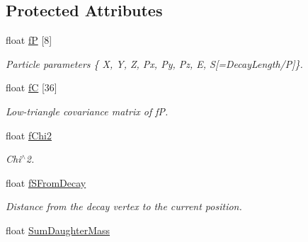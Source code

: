 \subsection*{Protected Attributes}
\begin{DoxyCompactItemize}
\item 
float \hyperlink{classKFParticleBase_a48e6bfc3b4faad54849cf2390d88f0c2}{fP} \mbox{[}8\mbox{]}\hypertarget{classKFParticleBase_a48e6bfc3b4faad54849cf2390d88f0c2}{}\label{classKFParticleBase_a48e6bfc3b4faad54849cf2390d88f0c2}

\begin{DoxyCompactList}\small\item\em Particle parameters \{ X, Y, Z, Px, Py, Pz, E, S\mbox{[}=Decay\+Length/P\mbox{]}\}. \end{DoxyCompactList}\item 
float \hyperlink{classKFParticleBase_ab360c40ba1445910057f9ad7f2d91dbf}{fC} \mbox{[}36\mbox{]}\hypertarget{classKFParticleBase_ab360c40ba1445910057f9ad7f2d91dbf}{}\label{classKFParticleBase_ab360c40ba1445910057f9ad7f2d91dbf}

\begin{DoxyCompactList}\small\item\em Low-\/triangle covariance matrix of fP. \end{DoxyCompactList}\item 
float \hyperlink{classKFParticleBase_a357092c0e3b9098e3ec7b214c6ed8002}{f\+Chi2}\hypertarget{classKFParticleBase_a357092c0e3b9098e3ec7b214c6ed8002}{}\label{classKFParticleBase_a357092c0e3b9098e3ec7b214c6ed8002}

\begin{DoxyCompactList}\small\item\em Chi$^\wedge$2. \end{DoxyCompactList}\item 
float \hyperlink{classKFParticleBase_a74aaf87923566638d5e80f6dec9593f9}{f\+S\+From\+Decay}\hypertarget{classKFParticleBase_a74aaf87923566638d5e80f6dec9593f9}{}\label{classKFParticleBase_a74aaf87923566638d5e80f6dec9593f9}

\begin{DoxyCompactList}\small\item\em Distance from the decay vertex to the current position. \end{DoxyCompactList}\item 
float \hyperlink{classKFParticleBase_aec9dca48a7a7160607cd6198a692c46d}{Sum\+Daughter\+Mass}\hypertarget{classKFParticleBase_aec9dca48a7a7160607cd6198a692c46d}{}\label{classKFParticleBase_aec9dca48a7a7160607cd6198a692c46d}


\end{DoxyCompactItemize}
